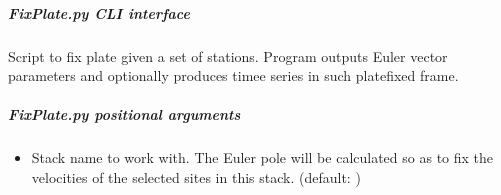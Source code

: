 \documentclass[letterpaper,10pt,english]{sphinxmanual}
\begin{document}
\begin{fulllineitems}
\label{\detokenize{pgamit.com:pgamit.com.FixPlate.build_design_vref}}
\pysigstartsignatures
\pysiglinewithargsret
{}
{}
{}
\pysigstopsignatures
\end{fulllineitems}


\begin{fulllineitems}
\label{\detokenize{pgamit.com:pgamit.com.FixPlate.main}}
\pysigstartsignatures
\pysiglinewithargsret
{}
{}
{}
\pysigstopsignatures
\end{fulllineitems}



\subparagraph{FixPlate.py \sphinxhyphen{} CLI interface}
\label{\detokenize{pgamit.com:FixPlate.py---CLI-interface}}
\sphinxAtStartPar
Script to fix plate given a set of stations. Program outputs Euler vector parameters and optionally produces timee series in such plate\sphinxhyphen{}fixed frame.

\begin{sphinxVerbatim}[commandchars=\\\{\}]
 \PYG{p}{[}\PYG{p}{]} \PYG{p}{[}  \PYG{p}{[} \PYG{p}{]}\PYG{p}{]} \PYG{p}{[}  \PYG{p}{[}\PYG{p}{[}\PYG{p}{]}\PYG{p}{]} \PYG{p}{]}\PYG{p}{]}
            \PYG{p}{[}\PYG{p}{]} \PYG{p}{[}  \PYG{p}{]} \PYG{p}{[}   \PYG{p}{]}
             
\end{sphinxVerbatim}


\subparagraph{FixPlate.py positional arguments}
\label{\detokenize{pgamit.com:FixPlate.py-positional-arguments}}\begin{itemize}
\item {} 
\sphinxAtStartPar
{\hyperref[\detokenize{pgamit.com:FixPlate.py-_stack-name_}]{}} \sphinxhyphen{} Stack name to work with. The Euler pole will be calculated so as to fix the velocities of the selected sites in this stack. (default: )

\end{itemize}
\end{document}
